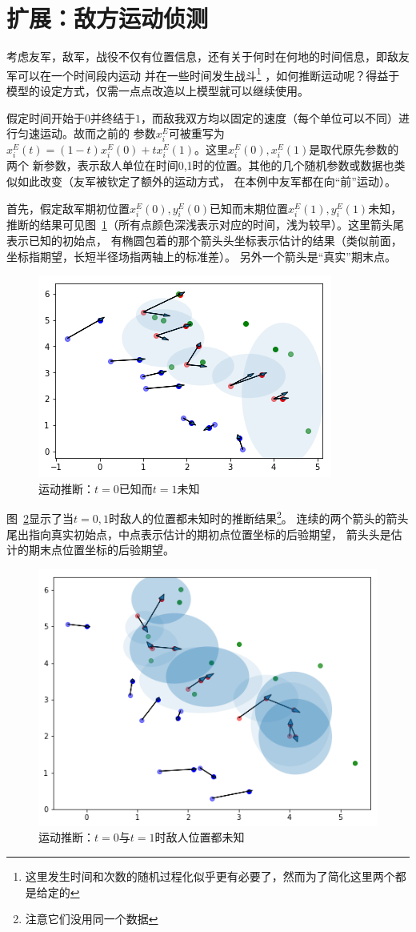 \documentclass{sicnuthesis}
\begin{document}
\clearpage
\section{扩展：敌方运动侦测}


考虑友军，敌军，战役不仅有位置信息，还有关于何时在何地的时间信息，即敌友军可以在一个时间段内运动
并在一些时间发生战斗\footnote{这里发生时间和次数的随机过程化似乎更有必要了，然而为了简化这里两个都是给定的}
，如何推断运动呢？得益于模型的设定方式，仅需一点点改造以上模型就可以继续使用。

假定时间开始于$0$并终结于$1$，而敌我双方均以固定的速度（每个单位可以不同）进行匀速运动。故而之前的
参数$x^E_i$可被重写为$x^E_i(t) = (1-t)x^E_i(0) + tx^E_i(1)$。这里$x^E_i(0),x^E_i(1)$是取代原先参数的两个
新参数，表示敌人单位在时间0,1时的位置。其他的几个随机参数或数据也类似如此改变（友军被钦定了额外的运动方式，
在本例中友军都在向“前”运动）。

首先，假定敌军期初位置$x^E_i(0),y^E_i(0)$已知而末期位置$x^E_i(1),y^E_i(1)$未知，
推断的结果可见图~\ref{fig:bkeu}（所有点颜色深浅表示对应的时间，浅为较早）。这里箭头尾表示已知的初始点，
有椭圆包着的那个箭头头坐标表示估计的结果（类似前面，坐标指期望，长短半径场指两轴上的标准差）。
另外一个箭头是“真实”期末点。

\begin{figure}[htb]
\includegraphics[width=0.4\linewidth]{bkeu.png}
\caption{运动推断：$t=0$已知而$t=1$未知}
\label{fig:bkeu}
\end{figure}


图~\ref{fig:bueu}显示了当$t=0,1$时敌人的位置都未知时的推断结果\footnote{注意它们没用同一个数据}。
连续的两个箭头的箭头尾出指向真实初始点，中点表示估计的期初点位置坐标的后验期望，
箭头头是估计的期末点位置坐标的后验期望。

\begin{figure}[htb]
\includegraphics[width=0.6\linewidth]{bueu.png}
\caption{运动推断：$t=0$与$t=1$时敌人位置都未知}
\label{fig:bueu}
\end{figure}
\end{document}
